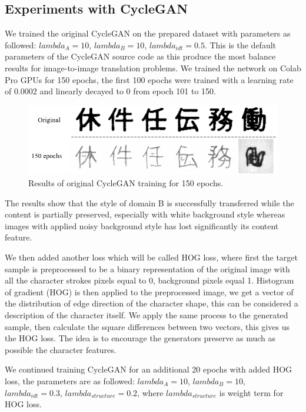 \documentclass[12pt]{report}
\begin{document}
\subsection{Experiments with CycleGAN}

We trained the original CycleGAN on the prepared dataset with parameters as followed: $lambda_A = 10$, $lambda_B = 10$, $lambda_{idt} = 0.5$. This is the default parameters of the CycleGAN source code as this produce the most balance results for image-to-image translation problems. We trained the network on Colab Pro GPUs for 150 epochs, the first 100 epochs were trained with a learning rate of 0.0002 and linearly decayed to 0 from epoch 101 to 150.

\begin{figure}[h]
	\centering
	\includegraphics[scale=0.8]{150-epochs}
	\caption{Results of original CycleGAN training for 150 epochs.}
	\label{fig:150-epochs}
\end{figure}

The results show that the style of domain B is successfully transferred while the content is partially preserved, especially with white background style whereas images with applied noisy background style has lost significantly its content feature. 

We then added another loss which will be called HOG loss, where first the target sample is preprocessed to be a binary representation of the original image with all the character strokes pixels equal to 0, background pixels equal 1. Histogram of gradient (HOG) \cite{hog} is then applied to the preprocessed image, we get a vector of the distribution of edge direction of the character shape, this can be considered a description of the character itself. We apply the same process to the generated sample, then calculate the square differences between two vectors, this gives us the HOG loss. The idea is to encourage the generators preserve as much as possible the character features.

We continued training CycleGAN for an additional 20 epochs with added HOG loss, the parameters are as followed: $lambda_A = 10$, $lambda_B = 10$, $lambda_{idt} = 0.3$, $lambda_{structure} = 0.2$, where $lambda_{structure}$ is weight term for HOG loss.
\end{document}
